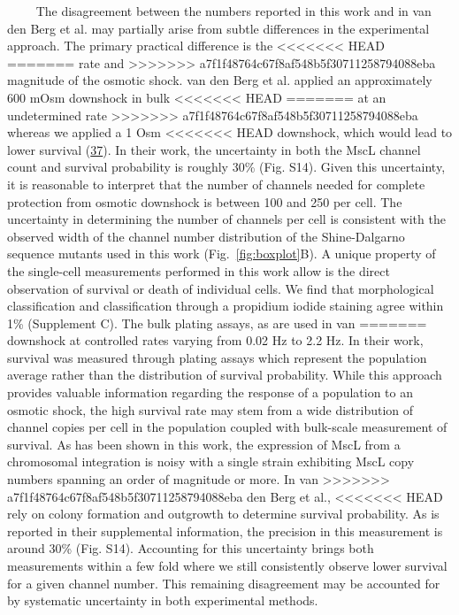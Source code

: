 ~~~~
The
disagreement
between
the
numbers
reported
in
this
work
and in
van
den
Berg
et al.
may
partially
arise
from
subtle
differences
in the
experimental
approach.
The
primary
practical
difference
is the
<<<<<<< HEAD
=======
rate
and
>>>>>>> a7f1f48764c67f8af548b5f30711258794088eba
magnitude
of the
osmotic
shock.
van
den
Berg
et al.
applied
an
approximately
600
mOsm
downshock
in
bulk
<<<<<<< HEAD
=======
at an
undetermined
rate
>>>>>>> a7f1f48764c67f8af548b5f30711258794088eba
whereas
we
applied
a 1
Osm
<<<<<<< HEAD
downshock,
which
would
lead
to
lower
survival
(\protect\hyperlink{ref-levina1999}{37}).
In
their
work,
the
uncertainty
in
both
the
MscL
channel
count
and
survival
probability
is
roughly
30\%
(Fig.
S14).
Given
this
uncertainty,
it is
reasonable
to
interpret
that
the
number
of
channels
needed
for
complete
protection
from
osmotic
downshock
is
between
100
and
250
per
cell.
The
uncertainty
in
determining
the
number
of
channels
per
cell
is
consistent
with
the
observed
width
of the
channel
number
distribution
of the
Shine-Dalgarno
sequence
mutants
used
in
this
work
(Fig.~\ref{fig:boxplot}B).
A
unique
property
of the
single-cell
measurements
performed
in
this
work
allow
is the
direct
observation
of
survival
or
death
of
individual
cells.
We
find
that
morphological
classification
and
classification
through
a
propidium
iodide
staining
agree
within
1\%
(Supplement
C).
The
bulk
plating
assays,
as are
used
in van
=======
downshock
at
controlled
rates
varying
from
0.02
Hz to
2.2
Hz. In
their
work,
survival
was
measured
through
plating
assays
which
represent
the
population
average
rather
than
the
distribution
of
survival
probability.
While
this
approach
provides
valuable
information
regarding
the
response
of a
population
to an
osmotic
shock,
the
high
survival
rate
may
stem
from a
wide
distribution
of
channel
copies
per
cell
in the
population
coupled
with
bulk-scale
measurement
of
survival.
As has
been
shown
in
this
work,
the
expression
of
MscL
from a
chromosomal
integration
is
noisy
with a
single
strain
exhibiting
MscL
copy
numbers
spanning
an
order
of
magnitude
or
more.
In van
>>>>>>> a7f1f48764c67f8af548b5f30711258794088eba
den
Berg
et
al.,
<<<<<<< HEAD
rely
on
colony
formation
and
outgrowth
to
determine
survival
probability.
As is
reported
in
their
supplemental
information,
the
precision
in
this
measurement
is
around
30\%
(Fig.
S14).
Accounting
for
this
uncertainty
brings
both
measurements
within
a few
fold
where
we
still
consistently
observe
lower
survival
for a
given
channel
number.
This
remaining
disagreement
may be
accounted
for by
systematic
uncertainty
in
both
experimental
methods.

